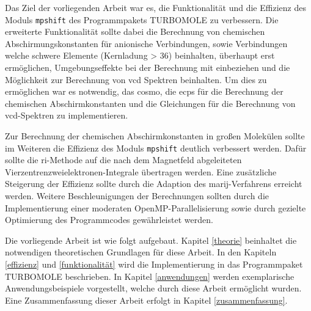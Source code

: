 Das Ziel der vorliegenden Arbeit war es, die Funktionalität und die Effizienz des Moduls \texttt{mpshift}\supercite{haser1992direct,kollwitz1996direct} des Programmpakets \textsc{TURBOMOLE}\supercite{ahlrichs1989electronic,TURBOMOLE,furche2014turbomole} zu verbessern. Die erweiterte Funktionalität sollte dabei die Berechnung von chemischen Abschirmungskonstanten für anionische Verbindungen, sowie Verbindungen welche schwere Elemente (Kernladung > 36) beinhalten, überhaupt erst ermöglichen, Umgebungseffekte bei der Berechnung mit einbeziehen und die Möglichkeit zur Berechnung von \ac{vcd} Spektren beinhalten. Um dies zu ermöglichen war es notwendig, das \ac{cosmo},\supercite{klamt1993cosmo} die \acp{ecp} für die Berechnung der chemischen Abschirmkonstanten und die Gleichungen für die Berechnung von \ac{vcd}-Spektren zu implementieren. 

Zur Berechnung der chemischen Abschirmkonstanten in großen Molekülen sollte im Weiteren die Effizienz des Moduls \texttt{mpshift} deutlich verbessert werden. Dafür sollte die \ac{ri}-Methode auf die nach dem Magnetfeld abgeleiteten Vierzentrenzweielektronen-Integrale übertragen werden. Eine zusätzliche Steigerung der Effizienz sollte durch die Adaption des \ac{marij}-Verfahrens erreicht werden. Weitere Beschleunigungen der Berechnungen sollten durch die Implementierung einer moderaten OpenMP-Parallelisierung sowie durch gezielte Optimierung des Programmcodes gewährleistet werden. 

\bigskip
Die vorliegende Arbeit ist wie folgt aufgebaut. Kapitel \ref{theorie} beinhaltet die notwendigen theoretischen Grundlagen für diese Arbeit. In den Kapiteln \ref{effizienz} und \ref{funktionalität} wird die Implementierung in das Programmpaket \textsc{TURBOMOLE} beschrieben. In Kapitel \ref{anwendungen} werden exemplarische Anwendungsbeispiele vorgestellt, welche durch diese Arbeit ermöglicht wurden. Eine Zusammenfassung dieser Arbeit erfolgt in Kapitel \ref{zusammenfassung}.